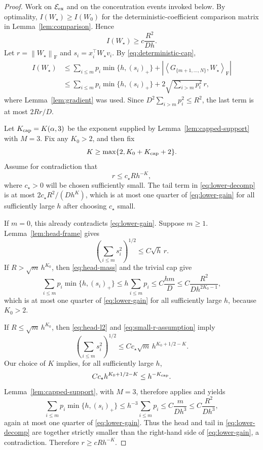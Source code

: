 \documentclass[11pt]{article}
\theoremstyle{remark}
\newcommand{\ip}[2]{\left\langle #1,#2\right\rangle}
\newcommand{\norm}[1]{\left\lVert #1\right\rVert}
\newcommand{\F}{\mathrm{F}}
\newcommand{\1}{\mathbf 1}
\begin{document}
\begin{proof}
Work on $\mathcal E_{\rm ex}$ and on the concentration events invoked
below.  By optimality, $I(W_\star)\geq I(W_0)$ for the
deterministic-coefficient comparison matrix in
Lemma~\ref{lem:comparison}.  Hence
\begin{equation}
 I(W_\star)\geq c\frac{R^2}{Dh}.
 \label{eq:lower-gain}
\end{equation}
Let $r=\norm{W_\star}_{\F}$ and
$s_i=x_i^\top W_\star v_i$.  By \eqref{eq:deterministic-cap},
\begin{align}
 I(W_\star)
 &\leq\sum_{i\leq m}p_i\min\{h,(s_i)_+\}
 +\left|\ip{G_{\{m+1,\ldots,N\}}}{W_\star}_{\F}\right|\\
 &\leq\sum_{i\leq m}p_i\min\{h,(s_i)_+\}
 +2\sqrt{\sum_{i>m}p_i^2}\,r,
 \label{eq:lower-decomp}
\end{align}
where Lemma~\ref{lem:gradient} was used.  Since
$D^2\sum_{i>m}p_i^2\leq R^2$, the last term is at most $2Rr/D$.

Let $K_{\rm cap}=K(\alpha,3)$ be the exponent supplied by
Lemma~\ref{lem:capped-support} with $M=3$.  Fix any $K_0>2$, and then
fix
\[
 K\geq\max\{2,K_0+K_{\rm cap}+2\}.
\]
Assume for contradiction that
\begin{equation}
 r\leq c_\star R h^{-K},
 \label{eq:small-r-assumption}
\end{equation}
where $c_\star>0$ will be chosen sufficiently small.  The tail term in
\eqref{eq:lower-decomp} is at most
$2c_\star R^2/(Dh^K)$, which is at most one quarter of
\eqref{eq:lower-gain} for all sufficiently large $h$ after choosing
$c_\star$ small.

If $m=0$, this already contradicts \eqref{eq:lower-gain}.  Suppose
$m\geq1$.  Lemma~\ref{lem:head-frame} gives
\begin{equation}
 \left(\sum_{i\leq m}s_i^2\right)^{1/2}\leq C\sqrt h\,r.
 \label{eq:head-l2}
\end{equation}
If $R>\sqrt m\,h^{K_0}$, then
\eqref{eq:head-mass} and the trivial cap give
\[
 \sum_{i\leq m}p_i\min\{h,(s_i)_+\}
 \leq h\sum_{i\leq m}p_i
 \leq C\frac{hm}{D}
 \leq C\frac{R^2}{Dh^{2K_0-1}},
\]
which is at most one quarter of \eqref{eq:lower-gain} for all
sufficiently large $h$, because $K_0>2$.

If $R\leq\sqrt m\,h^{K_0}$, then \eqref{eq:head-l2} and
\eqref{eq:small-r-assumption} imply
\[
 \left(\sum_{i\leq m}s_i^2\right)^{1/2}
 \leq Cc_\star\sqrt m\,h^{K_0+1/2-K}.
\]
Our choice of $K$ implies, for all sufficiently large $h$,
\[
 Cc_\star h^{K_0+1/2-K}\leq h^{-K_{\rm cap}}.
\]
Lemma~\ref{lem:capped-support}, with $M=3$, therefore applies and yields
\[
 \sum_{i\leq m}p_i\min\{h,(s_i)_+\}
 \leq h^{-3}\sum_{i\leq m}p_i
 \leq C\frac{m}{Dh^3}
 \leq C\frac{R^2}{Dh^3},
\]
again at most one quarter of \eqref{eq:lower-gain}.  Thus the head and
tail in \eqref{eq:lower-decomp} are together strictly smaller than the
right-hand side of \eqref{eq:lower-gain}, a contradiction.  Therefore
$r\geq cRh^{-K}$.
\end{proof}
\end{document}
